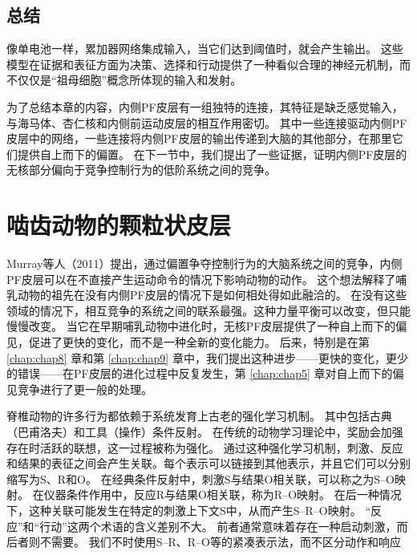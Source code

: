\subsection{总结}

像单电池一样，累加器网络集成输入，当它们达到阈值时，就会产生输出。
这些模型在证据和表征方面为决策、选择和行动提供了一种看似合理的神经元机制，而不仅仅是“祖母细胞”概念所体现的输入和发射。\par


为了总结本章的内容，内侧PF皮层有一组独特的连接，其特征是缺乏感觉输入，与海马体、杏仁核和内侧前运动皮层的相互作用密切。
其中一些连接驱动内侧PF皮层中的网络，一些连接将内侧PF皮层的输出传递到大脑的其他部分，在那里它们提供自上而下的偏置。
在下一节中，我们提出了一些证据，证明内侧PF皮层的无核部分偏向于竞争控制行为的低阶系统之间的竞争。\par



\section{啮齿动物的颗粒状皮层}

Murray等人（2011）提出，通过偏置争夺控制行为的大脑系统之间的竞争，内侧PF皮层可以在不直接产生运动命令的情况下影响动物的动作。
这个想法解释了哺乳动物的祖先在没有内侧PF皮层的情况下是如何相处得如此融洽的。
在没有这些领域的情况下，相互竞争的系统之间的联系最强。这种力量平衡可以改变，但只能慢慢改变。
当它在早期哺乳动物中进化时，无核PF皮层提供了一种自上而下的偏见，促进了更快的变化，而不是一种全新的变化能力。
后来，特别是在第 \ref{chap:chap8} 章和第 \ref{chap:chap9} 章中，我们提出这种进步——更快的变化，更少的错误——在PF皮层的进化过程中反复发生，第 \ref{chap:chap5} 章对自上而下的偏见竞争进行了更一般的处理。\par


脊椎动物的许多行为都依赖于系统发育上古老的强化学习机制。
其中包括古典（巴甫洛夫）和工具（操作）条件反射\cite{Dickinson 1980}。
在传统的动物学习理论中，奖励会加强存在时活跃的联想，这一过程被称为强化。
通过这种强化学习机制，刺激、反应和结果的表征之间会产生关联。每个表示可以链接到其他表示，并且它们可以分别缩写为S、R和O。
在经典条件反射中，刺激S与结果O相关联，可以称之为S–O映射。
在仪器条件作用中，反应R与结果O相关联，称为R–O映射。
在后一种情况下，这种关联可能发生在特定的刺激上下文S中，从而产生S–R–O映射。
“反应”和“行动”这两个术语的含义差别不大。
前者通常意味着存在一种启动刺激，而后者则不需要。
我们不时使用S–R、R–O等的紧凑表示法，而不区分动作和响应\par


